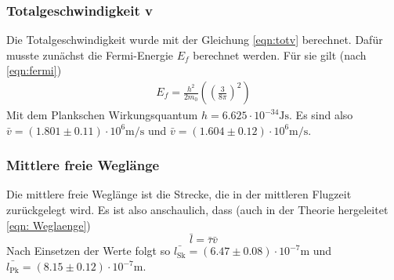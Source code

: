 \subsubsection{Totalgeschwindigkeit v}

Die Totalgeschwindigkeit wurde mit der Gleichung \eqref{eqn:totv} berechnet.
Dafür musste zunächst die Fermi-Energie $E_f$ berechnet werden. Für sie gilt (nach \eqref{eqn:fermi})
\begin{align*}
E_f = \frac{h^2}{2 m_0} \left( \left( \frac{3}{8 \pi} \right)^2 \right)
\end{align*}
Mit dem Plankschen Wirkungsquantum $h = 6.625 \cdot 10^{-34}\si{\joule\s}$.
Es sind also $\bar{v} = \left( 1.801 \pm 0.11 \right) \cdot 10^{6} \si{\m\per\s}$ und 
$\bar{v} = \left( 1.604 \pm 0.12 \right) \cdot 10^{6} \si{\m\per\s}$.

\subsubsection{Mittlere freie Weglänge}

Die mittlere freie Weglänge ist die Strecke, die in der mittleren Flugzeit
zurückgelegt wird. Es ist also anschaulich, dass (auch in der Theorie hergeleitet \eqref{eqn: Weglaenge}) 
\begin{equation*}
\bar{l} = \bar{ \tau } \bar{v}
\end{equation*}
Nach Einsetzen der Werte folgt so $\bar{l_\text{Sk}} = \left( 6.47 \pm 0.08 \right) \cdot 10^{-7} \si{\m}$
und $\bar{l_\text{Pk}} = \left( 8.15 \pm 0.12 \right) \cdot 10^{-7} \si{\m}$.
